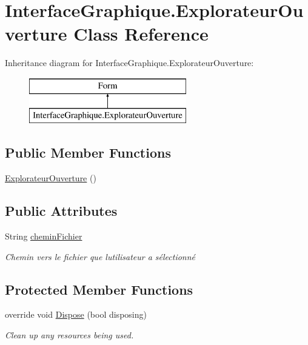\hypertarget{class_interface_graphique_1_1_explorateur_ouverture}{}\section{Interface\+Graphique.\+Explorateur\+Ouverture Class Reference}
\label{class_interface_graphique_1_1_explorateur_ouverture}
Inheritance diagram for Interface\+Graphique.\+Explorateur\+Ouverture\+:\begin{figure}[H]
\begin{center}
\leavevmode
\includegraphics[height=2.000000cm]{class_interface_graphique_1_1_explorateur_ouverture}
\end{center}
\end{figure}
\subsection*{Public Member Functions}
\begin{DoxyCompactItemize}
\item 
\hyperlink{class_interface_graphique_1_1_explorateur_ouverture_a0fb3e86c056c4826c5e3628c88e55102}{Explorateur\+Ouverture} ()
\end{DoxyCompactItemize}
\subsection*{Public Attributes}
\begin{DoxyCompactItemize}
\item 
String \hyperlink{class_interface_graphique_1_1_explorateur_ouverture_a38a03f28bca88334c4b4fb271af7b84e}{chemin\+Fichier}
\begin{DoxyCompactList}\small\item\em Chemin vers le fichier que l\textquotesingle{}utilisateur a sélectionné \end{DoxyCompactList}\end{DoxyCompactItemize}
\subsection*{Protected Member Functions}
\begin{DoxyCompactItemize}
\item 
override void \hyperlink{class_interface_graphique_1_1_explorateur_ouverture_a30f9fd85a97d7db8c0bd0f906684a216}{Dispose} (bool disposing)
\begin{DoxyCompactList}\small\item\em Clean up any resources being used. \end{DoxyCompactList}\end{DoxyCompactItemize}


